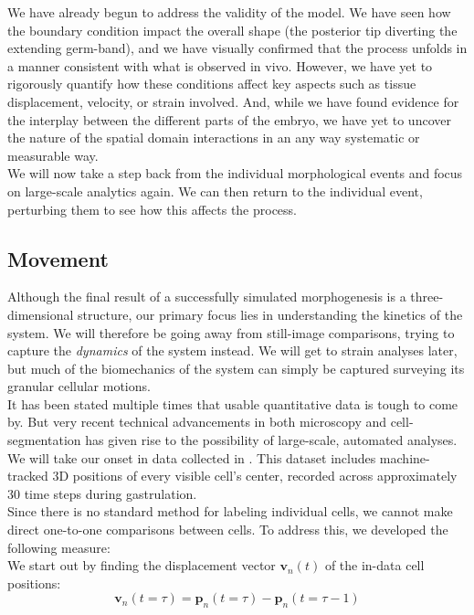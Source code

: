 We have already begun to address the validity of the model. We have seen how the boundary condition impact the overall shape (the posterior tip diverting the extending germ-band), and we have visually confirmed that the process unfolds in a manner consistent with what is observed in vivo. However, we have yet to rigorously quantify how these conditions affect key aspects such as tissue displacement, velocity, or strain involved. And, while we have found evidence for the interplay between the different parts of the embryo, we have yet to uncover the nature of the spatial domain interactions in an any way systematic or measurable way. \\


We will now take a step back from the individual morphological events and focus on large-scale analytics again. We can then return to the individual event, perturbing them to see how this affects the process.



\subsection{Movement}
Although the final result of a successfully simulated morphogenesis is a three-dimensional structure, our primary focus lies in understanding the kinetics of the system. We will therefore be going away from still-image comparisons, trying to capture the \textit{dynamics} of the system instead. We will get to strain analyses later, but much of the biomechanics of the system can simply be captured surveying its granular cellular motions.\\

It has been stated multiple times that usable quantitative data is tough to come by. But very recent technical advancements in both microscopy and cell-segmentation has given rise to the possibility of large-scale, automated analyses.\cite{stern2022deconstructing} We will take our onset in data collected in . This dataset includes machine-tracked 3D positions of every visible cell’s center, recorded across approximately 30 time steps during gastrulation.\\

Since there is no standard method for labeling individual cells, we cannot make direct one-to-one comparisons between cells. To address this, we developed the following measure:\\

We start out by finding the displacement vector $\boldsymbol{v}_n(t)$ of the in-data cell positions:
\begin{equation}
\label{eq:displacement}
\boldsymbol{v}_n(t=\tau) =\boldsymbol{p}_n(t=\tau) - \boldsymbol{p}_n(t=\tau-1)
\end{equation}


